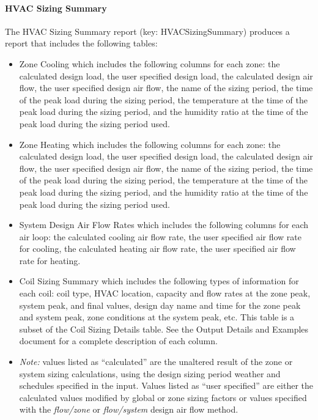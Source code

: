 \paragraph{HVAC Sizing Summary}\label{hvac-sizing-summary}

The HVAC Sizing Summary report (key: HVACSizingSummary) produces a report that includes the following tables:

\begin{itemize}
\item
  Zone Cooling which includes the following columns for each zone: the calculated design load, the user specified design load, the calculated design air flow, the user specified design air flow, the name of the sizing period, the time of the peak load during the sizing period, the temperature at the time of the peak load during the sizing period, and the humidity ratio at the time of the peak load during the sizing period used.
\item
  Zone Heating which includes the following columns for each zone: the calculated design load, the user specified design load, the calculated design air flow, the user specified design air flow, the name of the sizing period, the time of the peak load during the sizing period, the temperature at the time of the peak load during the sizing period, and the humidity ratio at the time of the peak load during the sizing period used.
\item
  System Design Air Flow Rates which includes the following columns for each air loop: the calculated cooling air flow rate, the user specified air flow rate for cooling, the calculated heating air flow rate, the user specified air flow rate for heating.
\item
  Coil Sizing Summary which includes the following types of information for each coil: coil type, HVAC location, capacity and flow rates at the zone peak, system peak, and final values, design day name and time for the zone peak and system peak, zone conditions at the system peak, etc. This table is a subset of the Coil Sizing Details table. See the Output Details and Examples document for a complete description of each column.
\item
  \emph{Note:} values listed as ``calculated'' are the unaltered result of the zone or system sizing calculations, using the design sizing period weather and schedules specified in the input. Values listed as ``user specified'' are either the calculated values modified by global or zone sizing factors or values specified with the \emph{flow/zone} or \emph{flow/system} design air flow method.
\end{itemize}

